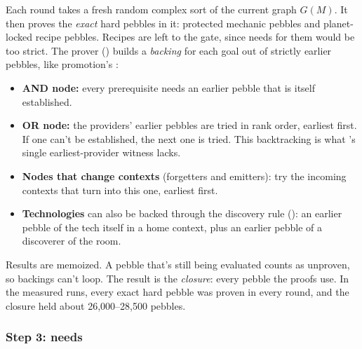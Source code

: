 Each round takes a fresh random complex sort of the current graph $G(M)$. It then proves the \emph{exact} hard pebbles in it: protected mechanic pebbles and planet-locked recipe pebbles. Recipes are left to the gate, since needs for them would be too strict. The prover () builds a \emph{backing} for each goal out of strictly earlier pebbles, like promotion's :
\begin{itemize}
  \item \textbf{AND node:} every prerequisite needs an earlier pebble that is itself established.
  \item \textbf{OR node:} the providers' earlier pebbles are tried in rank order, earliest first. If one can't be established, the next one is tried. This backtracking is what 's single earliest-provider witness lacks.
  \item \textbf{Nodes that change contexts} (forgetters and emitters): try the incoming contexts that turn into this one, earliest first.
  \item \textbf{Technologies} can also be backed through the discovery rule (): an earlier pebble of the tech itself in a home context, plus an earlier pebble of a discoverer of the room.
\end{itemize}
Results are memoized. A pebble that's still being evaluated counts as unproven, so backings can't loop. The result is the \emph{closure}: every pebble the proofs use. In the measured runs, every exact hard pebble was proven in every round, and the closure held about 26{,}000--28{,}500 pebbles.

\subsubsection{Step 3: needs}

